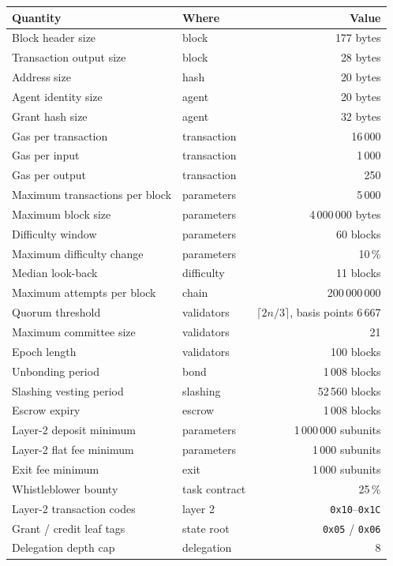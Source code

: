 \documentclass{article}
\begin{document}
\begin{table}[t]
\centering
\begin{tabular}{llr}
\toprule
\textbf{Quantity} & \textbf{Where} & \textbf{Value} \\
\midrule
Block header size & block & 177 bytes \\
Transaction output size & block & 28 bytes \\
Address size & hash & 20 bytes \\
Agent identity size & agent & 20 bytes \\
Grant hash size & agent & 32 bytes \\
Gas per transaction & transaction & 16\,000 \\
Gas per input & transaction & 1\,000 \\
Gas per output & transaction & 250 \\
Maximum transactions per block & parameters & 5\,000 \\
Maximum block size & parameters & 4\,000\,000 bytes \\
Difficulty window & parameters & 60 blocks \\
Maximum difficulty change & parameters & 10\,\% \\
Median look-back & difficulty & 11 blocks \\
Maximum attempts per block & chain & 200\,000\,000 \\
Quorum threshold & validators & $\lceil 2n/3 \rceil$, basis points 6\,667 \\
Maximum committee size & validators & 21 \\
Epoch length & validators & 100 blocks \\
Unbonding period & bond & 1\,008 blocks \\
Slashing vesting period & slashing & 52\,560 blocks \\
Escrow expiry & escrow & 1\,008 blocks \\
Layer-2 deposit minimum & parameters & 1\,000\,000 subunits \\
Layer-2 flat fee minimum & parameters & 1\,000 subunits \\
Exit fee minimum & exit & 1\,000 subunits \\
Whistleblower bounty & task contract & 25\,\% \\
Layer-2 transaction codes & layer 2 & \texttt{0x10}--\texttt{0x1C} \\
Grant / credit leaf tags & state root & \texttt{0x05} / \texttt{0x06} \\
Delegation depth cap & delegation & 8 \\

\end{tabular}
\end{table}
\end{document}
